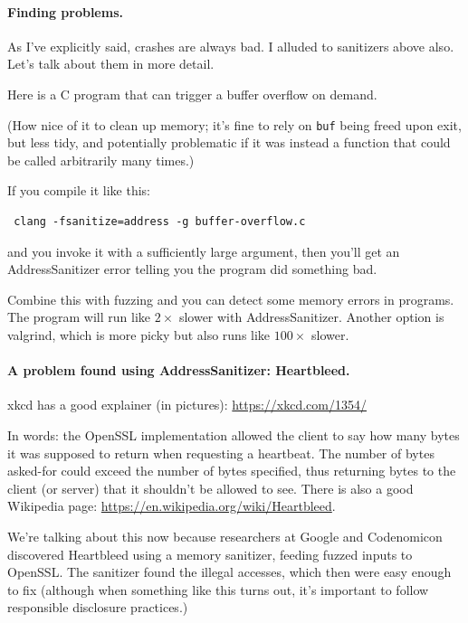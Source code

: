 \documentclass[11pt]{article}
\begin{document}
\paragraph{Finding problems.} As I've explicitly said, crashes
are always bad. I alluded to sanitizers above also. Let's talk
about them in more detail.

Here is a C program that can trigger a buffer overflow on demand.



(How nice of it to clean up memory; it's fine to rely on \texttt{buf}
being freed upon exit, but less tidy, and potentially problematic
if it was instead a function that could be called arbitrarily many times.)

If you compile it like this:
\begin{verbatim}
 clang -fsanitize=address -g buffer-overflow.c
\end{verbatim}
and you invoke it with a sufficiently large argument, then you'll
get an AddressSanitizer error telling you the program did something bad.

Combine this with fuzzing and you can detect some memory errors
in programs. The program will run like $2\times$ slower with
AddressSanitizer. Another option is valgrind, which is more
picky but also runs like $100\times$ slower.

\paragraph{A problem found using AddressSanitizer: Heartbleed.}

xkcd has a good explainer (in pictures): \url{https://xkcd.com/1354/}

In words: the OpenSSL implementation allowed the client to say
how many bytes it was supposed to return when requesting
a heartbeat. The number of bytes asked-for could exceed the
number of bytes specified, thus returning bytes to the client
(or server) that it shouldn't be allowed to see. There is also a good
Wikipedia page: \url{https://en.wikipedia.org/wiki/Heartbleed}.

We're talking about this now because researchers at Google and Codenomicon
discovered Heartbleed using a memory sanitizer, feeding fuzzed inputs
to OpenSSL. The sanitizer found the illegal accesses, which then were
easy enough to fix (although when something like this turns out, it's
important to follow responsible disclosure practices.)
\end{document}
